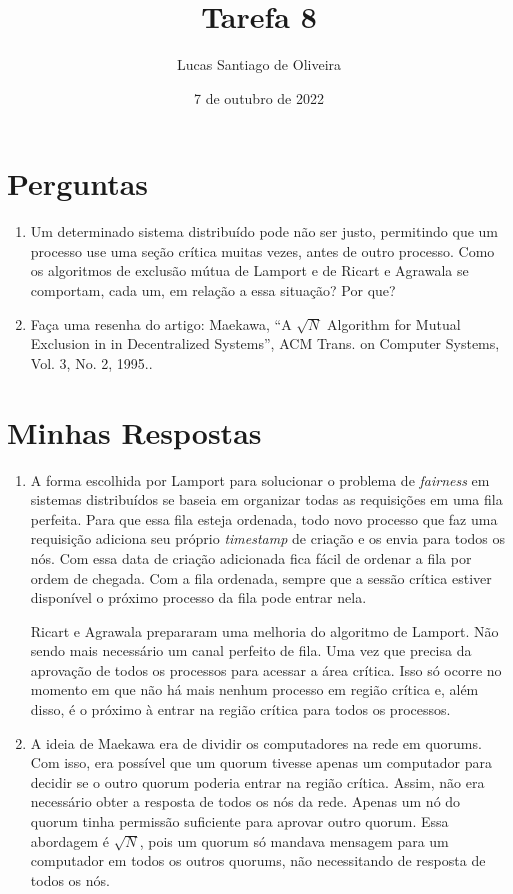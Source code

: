 \documentclass{article}
\title{Tarefa 8}
\author{Lucas Santiago de Oliveira}
\date{7 de outubro de 2022}
\begin{document}
    \maketitle

    \section*{Perguntas}
    \begin{enumerate}
        \item Um determinado sistema distribuído pode não ser justo, permitindo que um processo use uma seção crítica 
        muitas vezes, antes de outro processo. Como os algoritmos de exclusão mútua de Lamport e de Ricart e Agrawala 
        se comportam, cada um, em relação a essa situação? Por que? 
        \item Faça uma resenha do artigo: Maekawa, “A $\sqrt{N}$ Algorithm for Mutual Exclusion in in Decentralized Systems”, 
        ACM Trans. on Computer Systems, Vol. 3, No. 2, 1995..
    \end{enumerate}

    \section*{Minhas Respostas}
    \begin{enumerate}
        \item A forma escolhida por Lamport para solucionar o problema de \emph{fairness} em sistemas distribuídos
        se baseia em organizar todas as requisições em uma fila perfeita. Para que essa fila esteja ordenada, todo
        novo processo que faz uma requisição adiciona seu próprio \emph{timestamp} de criação e os envia para todos 
        os nós. Com essa data de criação adicionada fica fácil de ordenar a fila por ordem de chegada. Com a fila 
        ordenada, sempre que a sessão crítica estiver disponível o próximo processo da fila pode entrar nela.

        Ricart e Agrawala prepararam uma melhoria do algoritmo de Lamport. Não sendo mais necessário um canal perfeito
        de fila. Uma vez que precisa da aprovação de todos os processos para acessar a área crítica. Isso só ocorre 
        no momento em que não há mais nenhum processo em região crítica e, além disso, é o próximo à entrar na região 
        crítica para todos os processos.
        
        \item A ideia de Maekawa era de dividir os computadores na rede em quorums. Com isso, era possível que um quorum 
        tivesse apenas um computador para decidir se o outro quorum poderia entrar na região crítica. Assim, não era necessário
        obter a resposta de todos os nós da rede. Apenas um nó do quorum tinha permissão suficiente para aprovar outro quorum.
        Essa abordagem é $\sqrt{N}$, pois um quorum só mandava mensagem para um computador em todos os outros quorums, não
        necessitando de resposta de todos os nós.
    \end{enumerate}
\end{document}
